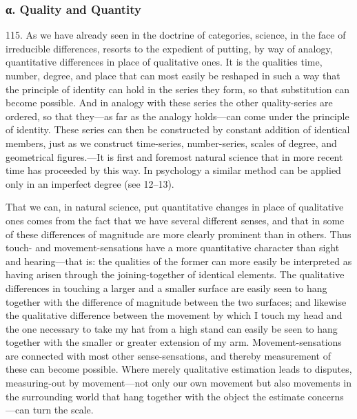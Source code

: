 \documentclass[12pt,a4paper]{book}
\newcommand{\opage}[1]{\marginnote{\footnotesize\textit{[#1]}}}
\begin{document}
\subsubsection*{α. Quality and Quantity}

115. As we have already seen in the doctrine of categories, science, in the
face of irreducible differences, resorts to the expedient of putting, by way
of analogy, quantitative differences in place of qualitative ones. It is the
qualities time, number, degree, and place that can most easily be reshaped in
such a way that the principle of identity can hold in the series they form, so
that \opage{275}substitution can become possible. And in analogy with these series the
other quality-series are ordered, so that they---as far as the analogy
holds---can come under the principle of identity. These series can then be
constructed by constant addition of identical members, just as we construct
time-series, number-series, scales of degree, and geometrical figures.---It is
first and foremost natural science that in more recent time has proceeded by
this way. In psychology a similar method can be applied only in an imperfect
degree (see 12--13).

That we can, in natural science, put quantitative changes in place of
qualitative ones comes from the fact that we have several different senses,
and that in some of these differences of magnitude are more clearly prominent
than in others. Thus touch- and movement-sensations have a more quantitative
character than sight and hearing---that is: the qualities of the former can
more easily be interpreted as having arisen through the joining-together of
identical elements. The qualitative differences in touching a larger and a
smaller surface are easily seen to hang together with the difference of
magnitude between the two surfaces; and likewise the qualitative difference
between the movement by which I touch my head and the one necessary to take my
hat from a high stand can easily be seen to hang together with the smaller or
greater extension of my arm. Movement-sensations are connected with most
other sense-sensations, and thereby measurement of these can become possible.
Where merely qualitative estimation leads to disputes, measuring-out by
movement---not only our own movement but also movements in the surrounding
world that hang together with the object the estimate concerns---can turn the
scale.
\end{document}
